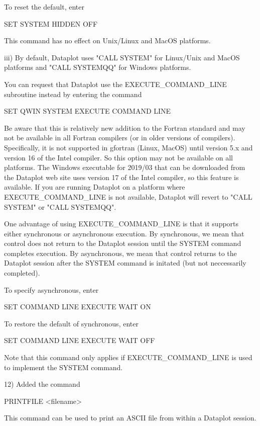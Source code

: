          To reset the default, enter

              SET SYSTEM HIDDEN OFF

         This command has no effect on Unix/Linux and MacOS platforms.

    iii) By default, Dataplot uses "CALL SYSTEM" for Linux/Unix and
         MacOS platforms and "CALL SYSTEMQQ" for Windows platforms.

         You can request that Dataplot use the EXECUTE_COMMAND_LINE
         subroutine instead by entering the command

              SET QWIN SYSTEM EXECUTE COMMAND LINE

         Be aware that this is relatively new addition to the Fortran
         standard and may not be available in all Fortran compilers (or
         in older versions of compilers).  Specifically, it is not
         supported in gfortran (Linux, MacOS) until version 5.x and
         version 16 of the Intel compiler.  So this option may not be
         available on all platforms.  The Windows executable for 2019/03
         that can be downloaded from the Dataplot web site uses version 17
         of the Intel compiler, so this feature is available.  If you are
         running Dataplot on a platform where EXECUTE_COMMAND_LINE is not
         available, Dataplot will revert to "CALL SYSTEM" or
         "CALL SYSTEMQQ".

         One advantage of using EXECUTE_COMMAND_LINE is that it supports
         either synchronous or asynchronous execution.  By synchronous, we
         mean that control does not return to the Dataplot session until
         the SYSTEM command completes execution.  By asynchronous, we
         mean that control returns to the Dataplot session after the
         SYSTEM command is initated (but not neccessarily completed).

         To specify asynchronous, enter

             SET COMMAND LINE EXECUTE WAIT ON

         To restore the default of synchronous, enter

             SET COMMAND LINE EXECUTE WAIT OFF

         Note that this command only applies if EXECUTE_COMMAND_LINE is
         used to implement the SYSTEM command.

12) Added the command

      PRINTFILE <filename>

    This command can be used to print an ASCII file from within a
    Dataplot session.

